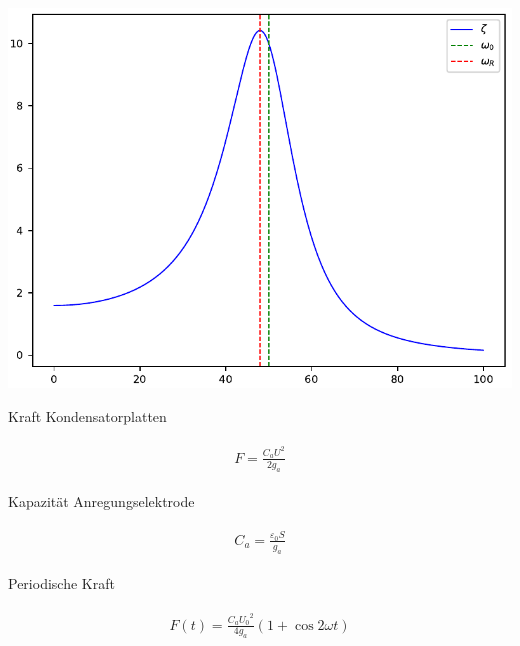 \minipage{\linewidth}
    \begin{center}
        \captionsetup{type=figure}
        \begin{adjustbox}{max width=\linewidth, keepaspectratio}
            \includegraphics[]{pdf/Lorentzkurve}
        \end{adjustbox}
        \label{fig:Lorentzkurve}
    \end{center}
\endminipage

Kraft Kondensatorplatten

\begin{align}
    \label{eq:KraftKondensatorplatten}
    \begin{split}
        F = \frac{C_a U^2}{2 g_a}
    \end{split}
\end{align}

Kapazität Anregungselektrode

\begin{align}
    \label{eq:KapazitaetAnregungselektrode}
    \begin{split}
        C_a = \frac{\varepsilon_0 S}{g_a}
    \end{split}
\end{align}

Periodische Kraft

\begin{align}
    \label{eq:PeriodischeKraft}
    \begin{split}
        F \left( t \right) = \frac{C_a {U_0}^2}{4 g_a} \left( 1 + \cos 2 \omega t \right)
    \end{split}
\end{align}

